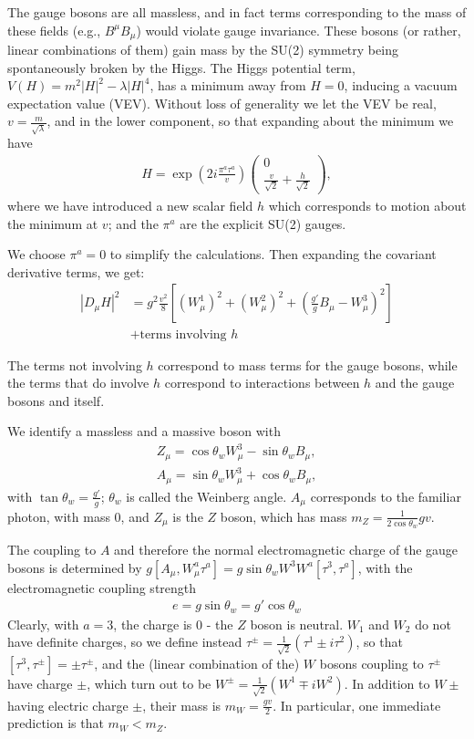 The gauge bosons are all massless, and in fact terms corresponding to the mass of these fields (e.g., $B^\mu B_\mu$) would violate gauge invariance.
These bosons (or rather, linear combinations of them) gain mass by the SU(2) symmetry being spontaneously broken by the Higgs.
The Higgs potential term, $V(H) = m^2 |H|^2 - \lambda |H|^4$, has a minimum away from $H=0$, inducing a vacuum expectation value (VEV).
Without loss of generality we let the VEV be real, $v=\frac{m}{\sqrt{\lambda}}$, and in the lower component, so that expanding about the minimum we have
\begin{align}
H = \exp\left(2i\frac{\pi^a\tau^a}{v}\right) \begin{pmatrix}0\\\frac{v}{\sqrt{2}}+\frac{h}{\sqrt{2}}\end{pmatrix},
\end{align}
where we have introduced a new scalar field $h$ which corresponds to motion about the minimum at $v$; and the $\pi^a$ are the explicit SU(2) gauges.

We choose $\pi^a=0$ to simplify the calculations.
Then expanding the covariant derivative terms, we get:
\begin{align}
  |D_\mu H|^2 &= g^2\frac{v^2}{8}\left[ (W_\mu^1)^2+(W_\mu^2)^2+\left(\frac{g'}{g}B_\mu-W_\mu^3\right)^2\right]\nonumber\\
  &+\text{terms involving $h$}
\end{align}

The terms not involving $h$ correspond to mass terms for the gauge bosons, while the terms that do involve $h$ correspond to interactions between $h$ and the gauge bosons and itself.

We identify a massless and a massive boson with
\begin{align}
Z_\mu = \cos\theta_w W_\mu^3 - \sin\theta_w B_\mu,\\
A_\mu = \sin\theta_w W_\mu^3 + \cos\theta_w B_\mu,
\end{align}
with $\tan \theta_w = \frac{g'}{g}$; $\theta_w$ is called the Weinberg angle.
$A_\mu$ corresponds to the familiar photon, with mass $0$, and $Z_\mu$ is the $Z$ boson, which has mass $m_Z = \frac{1}{2\cos\theta_w}gv$.

The coupling to $A$ and therefore the normal electromagnetic charge of the gauge bosons is determined by $g[A_\mu,W_\mu^a\tau^a] = g\sin\theta_w W^3W^a[\tau^3,\tau^a]$, with the electromagnetic coupling strength
\begin{align}
e = g\sin\theta_w = g'\cos\theta_w
\end{align}
Clearly, with $a=3$, the charge is $0$ - the $Z$ boson is neutral.
$W_1$ and $W_2$ do not have definite charges, so we define instead $\tau^\pm = \frac{1}{\sqrt{2}}\left(\tau^1\pm i\tau^2\right)$, so that $[\tau^3,\tau^\pm] = \pm \tau^\pm$, and the (linear combination of the) $W$ bosons coupling to $\tau^\pm$ have charge $\pm$, which turn out to be $W^\pm = \frac{1}{\sqrt{2}}\left(W^1 \mp iW^2\right)$.
In addition to $W\pm$ having electric charge $\pm$, their mass is $m_W = \frac{gv}{2}$.
In particular, one immediate prediction is that $m_W<m_Z$.


